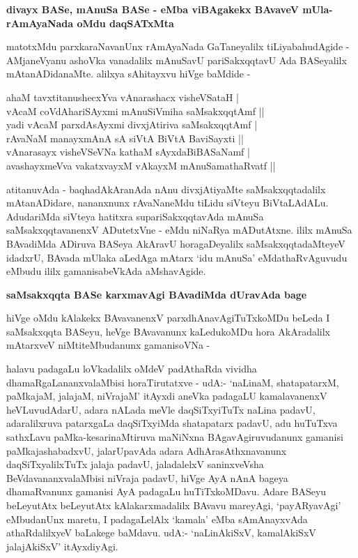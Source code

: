 {\bigskip
\noindent
{\large\bf divayx BASe, mAnuSa BASe - eMba viBAgakekx BAvaveV mUla-rAmAyaNada oMdu daqSATxMta}}\label{page14}
\medskip

\noindent
matotxMdu parxkaraNavanUnx rAmAyaNada GaTaneyalilx tiLiyabahudAgide - AMjaneVyanu ashoVka vanadalilx mAnuSavU pariSakxqqtavU Ada BASeyalilx mAtanADidanaMte. alilxya sAhitayxvu hiVge baMdide - 

\smallskip
\begin{shloka}
ahaM tavxtitanushecxYva vAnarashacx visheVSataH |\\\label{14}
vAcaM coVdAhariSAyxmi mAnuSiVmiha saMsakxqqtAmf ||\\[4pt]

yadi vAcaM parxdAsAyxmi divxjAtiriva saMsakxqqtAmf |\\
rAvaNaM manayxmAnA sA siVtA BiVtA BaviSayxti ||\\[4pt]

vAnarasayx visheVSeVNa kathaM sAyxdaBiBASaNamf |\\
avashayxmeVva vakatxvayxM vAkayxM mAnuSamathaRvatf ||
\end{shloka}
\smallskip

\noindent
atitanuvAda - baqhadAkAranAda nAnu divxjAtiyaMte saMsakxqqtadalilx mAtanADidare, nananxnunx rAvaNaneMdu tiLidu siVteyu BiVtaLAdALu. AdudariMda siVteya hatitxra supariSakxqqtavAda mAnuSa saMsakxqqtavanenxV ADutetxVne - eMdu niNaRya mADutAtxne. ililx mAnuSa BAvadiMda ADiruva BASeya AkAravU horagaDeyalilx saMsakxqqtadaMteyeV idadxrU, BAvada mUlaka aLedAga mAtarx `idu mAnuSa' eMdathaRvAguvudu eMbudu ililx gamanisabeVkAda aMshavAgide.

\newpage

{\bigskip
\noindent
{\large\bf saMsakxqqta BASe karxmavAgi BAvadiMda dUravAda bage}}\label{page15}
\medskip

\noindent
hiVge oMdu kAlakekx BAvavanenxV parxdhAnavAgiTuTxkoMDu beLeda I saMsakxqqta BASeyu, heVge BAvavanunx kaLedukoMDu hora AkAradalilx mAtarxveV niMtiteMbudanunx gamanisoVNa - 

halavu padagaLu loVkadalilx oMdeV padAthaRda vividha dhamaRgaLananxvalaMbisi horaTirutatxve - udA:- `naLinaM, shatapatarxM, paMkajaM, jalajaM, niVrajaM' itAyxdi aneVka padagaLU kamalavanenxV heVLuvudAdarU, adara nALada meVle daqSiTxyiTuTx naLina padavU, adaralilxruva patarxgaLa daqSiTxyiMda shatapatarx padavU, adu huTuTxva sathxLavu paMka-kesarinaMtiruva maNiNxna BAgavAgiruvudanunx gamanisi paMkajashabadxvU, jalarUpavAda adara AdhArasAthxnavanunx daqSiTxyalilxTuTx jalaja padavU, jaladalelxV saninxveVsha BeVdavananxvalaMbisi niVraja padavU, hiVge AyA nAnA bageya dhamaRvanunx gamanisi AyA padagaLu huTiTxkoMDavu. Adare BASeyu beLeyutAtx beLeyutAtx kAlakarxmadalilx BAvavu mareyAgi, `payARyavAgi' eMbudanUnx maretu, I padagaLelAlx `kamala' eMba sAmAnayxvAda athaRdalilxyeV baLakege baMdavu. udA:- `naLinAkiSxV, kamalAkiSxV jalajAkiSxV' itAyxdiyAgi.

